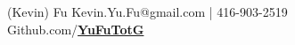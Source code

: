 \documentclass[letterpaper]{kevin-resume} %
\begin{document}


 {(Kevin) Fu} { %
	\hspace{6mm}Kevin.Yu.Fu@gmail.com | 416-903-2519 \\ %
	\hspace{6mm}Github.com/\href{https://github.com/YuFuTotG} {\textbf{YuFuTotG}} %
}

\end{document}
